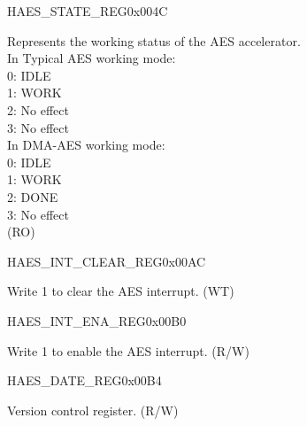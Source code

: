 \begin{register}{H}{AES\_STATE\_REG}{0x004C}\label{regdesc:AESSTATEREG}
%
%
\regnewline%
\begin{regdesc}\begin{reglist}
\label{fielddesc:AESSTATE}\item [AES\_STATE] Represents the working status of the AES accelerator. \\
In Typical AES working mode:\\
0: IDLE\\
1: WORK\\
2: No effect\\
3: No effect\\
In DMA-AES working mode:\\
0: IDLE\\
1: WORK\\
2: DONE\\
3: No effect\\
(RO) 
\end{reglist}\end{regdesc}
\end{register}



\begin{register}{H}{AES\_INT\_CLEAR\_REG}{0x00AC}\label{regdesc:AESINTCLEARREG}
%
%
\regnewline%
\begin{regdesc}\begin{reglist}
\label{fielddesc:AESINTCLEAR}\item [AES\_INT\_CLEAR] Write 1 to clear the AES interrupt. (WT)
\end{reglist}\end{regdesc}
\end{register}


\begin{register}{H}{AES\_INT\_ENA\_REG}{0x00B0}\label{regdesc:AESINTENAREG}
%
%
\regnewline%
\begin{regdesc}\begin{reglist}
\label{fielddesc:AESINTENA}\item [AES\_INT\_ENA] Write 1 to enable the AES interrupt. (R/W)
\end{reglist}\end{regdesc}
\end{register}


\begin{register}{H}{AES\_DATE\_REG}{0x00B4}\label{regdesc:AESDATEREG}
%
%
\regnewline%
\begin{regdesc}\begin{reglist}
\label{fielddesc:AESDATE}\item [AES\_DATE] Version control register. (R/W)
\end{reglist}\end{regdesc}
\end{register}

